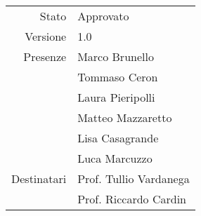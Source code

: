 \begin{center}
	\begin{tabular}{r|l}
		Stato & Approvato \\
		Versione & 1.0 \\
		Presenze & Marco Brunello \\
		& Tommaso Ceron \\
		& Laura Pieripolli \\
		& Matteo Mazzaretto \\
		& Lisa Casagrande \\
		& Luca Marcuzzo \\
		Destinatari & Prof. Tullio Vardanega \\
		& Prof. Riccardo Cardin
	\end{tabular}
\end{center}